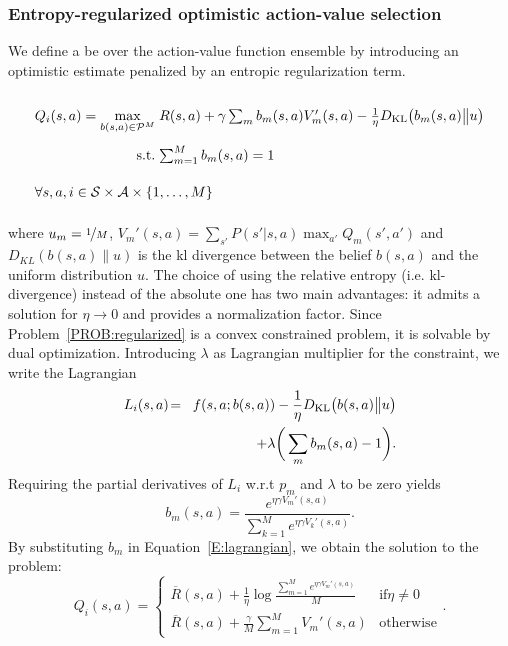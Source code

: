 \subsubsection{Entropy-regularized optimistic action-value selection}
We define a \gls{be} over the action-value function ensemble by introducing an optimistic estimate penalized by an entropic regularization term.
\begin{probdef}
\begin{equation}
\arraycolsep=1.4pt\def\arraystretch{2.2}
\begin{array}{rrclcl}
\displaystyle Q_i(s,a) = \max_{b(s,a) \in \mathcal{P}^M} & \multicolumn{3}{l}{R(s,a) + \gamma \sum_m{b}_m(s,a)V_m'(s,a)-\frac{1}{\eta}D_{\mathrm{KL}}\big(b_m(s,a)\big{\|}u\big) } \\
\textrm{s.t.} & \sum_{m=1}^{M} b_m(s,a) & = & 1 \\
\multicolumn{4}{l}{ \forall s,a,i \in \mathcal{S} \times \mathcal{A} \times \{1,\dots,M\}}
\end{array}\nonumber
\end{equation}\label{PROB:regularized}
\end{probdef}
\noindent where $u_m  =  \nicefrac{1}{M}$, $V_m'(s,a) \! = \! \sum_{s'} P(s'|s,a)\max_{a'}Q_m(s',a')$ and $D_{KL}(b(s,a)\| u)$ is the \gls{kl} divergence between the belief $b(s,a)$ and the uniform distribution $u$.
The choice of using the relative entropy (i.e. \gls{kl}-divergence) instead of the absolute one has two main advantages: it admits a solution for $\eta \to 0$ and provides a normalization factor.
Since Problem~\ref{PROB:regularized} is a convex constrained problem, it is solvable by dual optimization. Introducing $\lambda$ as Lagrangian multiplier for the constraint, we write the Lagrangian
\begin{eqnarray}
L_i(s,a) \!&=& \!f(s,a; b(s,a)) -\frac{1}{\eta}D_{\mathrm{KL}}\big(b(s,a)\big{\|}u\big)\nonumber \\ && + \lambda\bigg(\sum_m b_m(s,a) - 1\bigg).\label{E:lagrangian}
\end{eqnarray}
Requiring the partial derivatives of $L_i$ w.r.t $p_m$ and $\lambda$ to be zero yields 
\begin{equation}
b_m(s,a) = \frac{e^{\eta  \gamma V_m'(s,a)}}{\sum_{k=1}^{M} e^{\eta \gamma   V_k'(s,a)}}\label{pm}.
\end{equation} 
By substituting $b_m$ in Equation~\ref{E:lagrangian}, we obtain the solution to the problem:
\begin{equation}
Q_i(s,a) = \begin{cases}
\overline{R}(s,a) + \frac{1}{\eta} \log \frac{\sum_{m=1}^Me^{\eta \gamma  V_m'(s,a) }}{M} & \mathrm{if} \eta \neq 0 \label{OBE} \\
\overline{R}(s,a) + \frac{\gamma}M \sum_{m=1}^{M} V_m'(s,a) & \mathrm{otherwise}
\end{cases}.
\end{equation}
